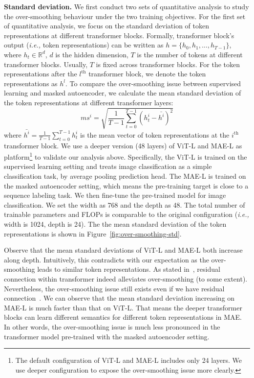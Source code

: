 \documentclass{article}
\theoremstyle{plain}
\theoremstyle{definition}
\theoremstyle{remark}
\newcommand{\ie}{\emph{i.e.,}\xspace}
\begin{document}
\textbf{Standard deviation.} We first conduct two sets of quantitative analysis to study the over-smoothing behaviour under the two training objectives. For the first set of quantitative analysis, we focus on the standard deviation of token representations at different transformer blocks. Formally, transformer block's output (\ie token representations) can be written as $h=\{h_0, h_1, ..., h_{T-1}\}$, where $h_t \in \mathbb{R}^{d}$, $d$ is the hidden dimension, $T$ is the number of tokens at different transformer blocks. Usually, $T$ is fixed across transformer blocks. For the token representations after the $l^{\mathrm{th}}$ transformer block, we denote the token representations as $h^l$. To compare the over-smoothing issue between supervised learning and masked autoencoder, we calculate the mean standard deviation of the token representations at different transformer layers:
\begin{equation}
{ms}^{i} =  \sqrt{\frac{1}{T-1} \sum\limits_{t=0}^{T-1}  \left(h_t^i - \bar{h^i}\right)^2 }
\end{equation}
where $\bar{h^i}=\frac{1}{T-1}{\sum\limits_{t=0}^{T-1} h_t^i}$ is the mean vector of token representations at the $i^{\mathrm{th}}$ transformer block. 
We use a deeper version (48 layers) of ViT-L and MAE-L as platform\footnote{The default configuration of ViT-L and MAE-L includes only 24 layers. We use deeper configuration to expose the over-smoothing issue more clearly.} to validate our analysis above. Specifically, the ViT-L is trained on the supervised learning setting and treats image classification as a simple classification task, by average pooling prediction head. The MAE-L is trained on the masked autoencoder setting, which means the pre-training target is close to a sequence labeling task. We then fine-tune the pre-trained model for image classification. We set the width as 768 and the depth as 48. The total number of trainable parameters and FLOPs is comparable to the original configuration (\ie width is 1024, depth is 24). The the mean standard deviation of the token representations is shown in Figure~\ref{fig:over-smoothing-std}. 

Observe that the mean standard deviations of ViT-L and MAE-L both increase along depth. Intuitively, this contradicts with our expectation as the over-smoothing leads to similar token representations. As stated in~\citep{dong2021attention}, residual connection within transformer indeed alleviates over-smoothing (to some extent). Nevertheless, the over-smoothing issue still exists even if we have residual connection~\citep{dong2021attention,shi2021revisiting}.  We can observe that the mean standard deviation increasing on MAE-L is much faster than that on ViT-L. That means the deeper transformer blocks can learn different semantics for different token representations in MAE. In other words, the over-smoothing issue is much less pronounced in the transformer model pre-trained with the masked autoencoder setting. 
\end{document}
